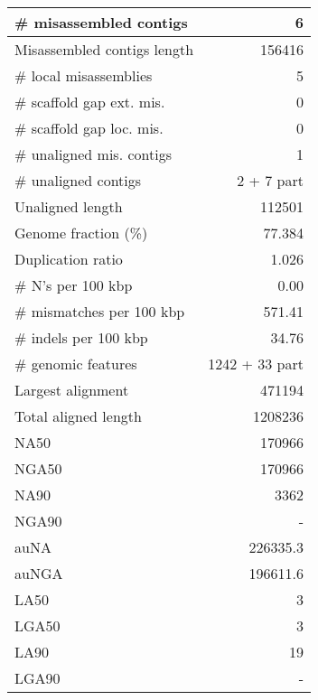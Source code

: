 \documentclass[12pt,a4paper]{article}
\begin{document}
\begin{table}[ht]
\begin{center}
\begin{tabular}{|l*{1}{|r}|}
\# misassembled contigs & 6 \\ \hline
Misassembled contigs length & 156416 \\ \hline
\# local misassemblies & 5 \\ \hline
\# scaffold gap ext. mis. & 0 \\ \hline
\# scaffold gap loc. mis. & 0 \\ \hline
\# unaligned mis. contigs & 1 \\ \hline
\# unaligned contigs & 2 + 7 part \\ \hline
Unaligned length & 112501 \\ \hline
Genome fraction (\%) & 77.384 \\ \hline
Duplication ratio & 1.026 \\ \hline
\# N's per 100 kbp & 0.00 \\ \hline
\# mismatches per 100 kbp & 571.41 \\ \hline
\# indels per 100 kbp & 34.76 \\ \hline
\# genomic features & 1242 + 33 part \\ \hline
Largest alignment & 471194 \\ \hline
Total aligned length & 1208236 \\ \hline
NA50 & 170966 \\ \hline
NGA50 & 170966 \\ \hline
NA90 & 3362 \\ \hline
NGA90 & - \\ \hline
auNA & 226335.3 \\ \hline
auNGA & 196611.6 \\ \hline
LA50 & 3 \\ \hline
LGA50 & 3 \\ \hline
LA90 & 19 \\ \hline
LGA90 & - \\ \hline
\end{tabular}
\end{center}
\end{table}
\end{document}
